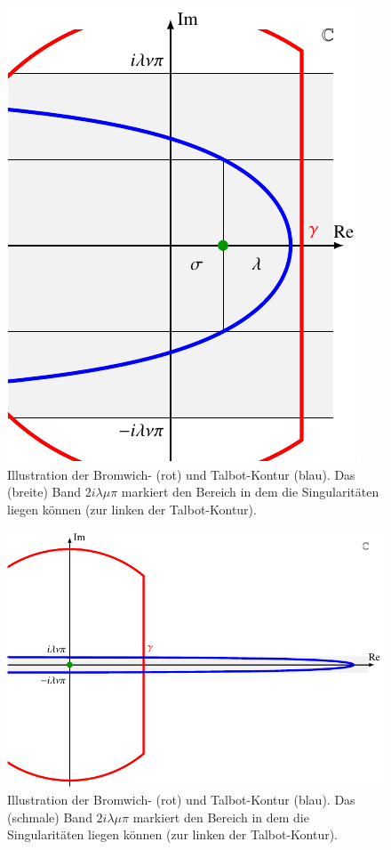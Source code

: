 \begin{figure}
\centering
\includegraphics{papers/laplace/images/talbot1.pdf}
\caption{Illustration der Bromwich- (rot) und Talbot-Kontur (blau). Das (breite) Band $2i\lambda\mu\pi$ markiert den Bereich in dem die Singularitäten liegen können (zur linken der Talbot-Kontur).
\label{laplace:talbot1}}
\end{figure}

\begin{figure}
\centering
\includegraphics{papers/laplace/images/talbot2.pdf}
\caption{Illustration der Bromwich- (rot) und Talbot-Kontur (blau). Das (schmale) Band $2i\lambda\mu\pi$ markiert den Bereich in dem die Singularitäten liegen können (zur linken der Talbot-Kontur).
\label{laplace:talbot2}}
\end{figure}

